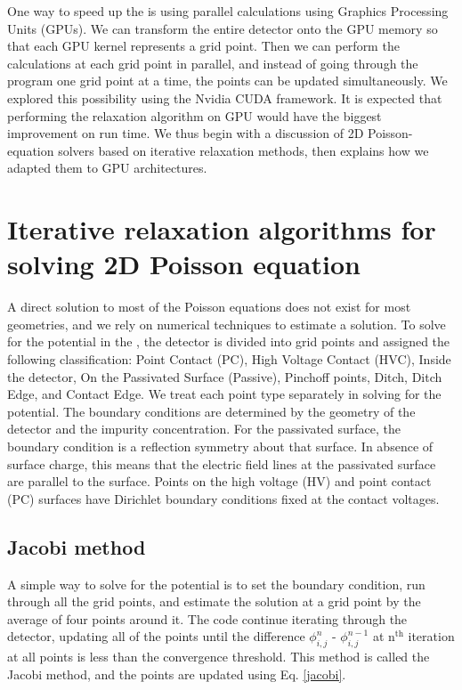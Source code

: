 One way to speed up the {\tdsim} is using parallel calculations using Graphics Processing Units (GPUs). We can transform the entire detector onto the GPU memory so that each GPU kernel represents a grid point. Then we can perform the calculations at each grid point in parallel, and instead of going through the program one grid point at a time, the points can be updated simultaneously. We explored this possibility using the Nvidia CUDA {\cpp} framework. It is expected that performing the relaxation algorithm on GPU would have the biggest improvement on run time. We thus begin with a discussion of 2D Poisson-equation solvers based on iterative relaxation methods, then explains how we adapted them to GPU architectures.

\section{Iterative relaxation algorithms for solving 2D Poisson equation}

A direct solution to most of the Poisson equations does not exist for most geometries, and we rely on numerical techniques to estimate a solution. To solve for the potential in the {\tdsim}, the detector is divided into grid points and assigned the following classification: Point Contact (PC), High Voltage Contact (HVC), Inside the detector, On the Passivated Surface (Passive), Pinchoff points, Ditch, Ditch Edge, and Contact Edge. We treat each point type separately in solving for the potential. The boundary conditions are determined by the geometry of the detector and the impurity concentration. For the passivated surface, the boundary condition is a reflection symmetry about that surface. In absence of surface charge, this means that the electric field lines at the passivated surface are parallel to the surface. Points on the high voltage (HV) and point contact (PC) surfaces have Dirichlet boundary conditions fixed at the contact voltages.

\subsection{Jacobi method}
A simple way to solve for the potential is to set the boundary condition, run through all the grid points, and estimate the solution at a grid point by the average of four points around it. The code continue iterating through the detector, updating all of the points until the difference $\phi_{i,j}^{n}$ - $\phi_{i,j}^{n-1}$ at n$^{\text{th}}$ iteration at all points is less than the convergence threshold. This method is called the Jacobi method, and the points are updated using Eq. \ref{jacobi}.

